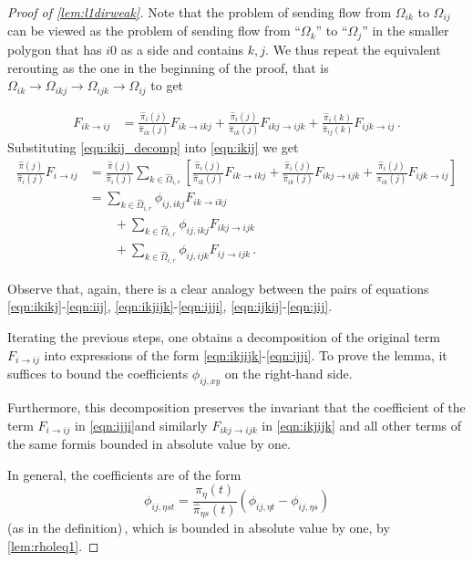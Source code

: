 \documentclass[a4paper, 12p]{article}
\numberwithin{equation}{section}
\newcommand{\Omorproj}{\hat{\Omega}}
\newcommand{\piorproj}{\hat{\pi}}
\newcommand{\flo}[2]{F_{#1 \rightarrow #2}}
\newcommand{\rar}{\rightarrow}
\newcommand{\Om}{\Omega}
\begin{document}
\begin{proof}[Proof of \cref{lem:l1dirweak}]
    Note that the problem of sending flow from $\Om_{ik}$ to $\Om_{ij}$ can be viewed as the problem of sending flow from ``$\Om_k$'' to ``$\Om_j$'' in the smaller polygon that has $i0$ as a side and contains $k,j$. We thus repeat the equivalent rerouting as the one in the beginning of the proof, that is $\Om_{ik}\rar\Om_{ikj}\rar\Om_{ijk}\rar\Om_{ij}$ to get
    
    \begin{align}\label{eqn:ikij_decomp}
        \flo{ik}{ij}&=\frac{\piorproj_i(j)}{\piorproj_{ik}(j)}\flo{ik}{ikj}+\frac{\piorproj_i(j)}{\piorproj_{ik}(j)}\flo{ikj}{ijk}+\frac{\piorproj_i(k)}{\piorproj_{ij}(k)}\flo{ijk}{ij}\,.
    \end{align}
    Substituting \eqref{eqn:ikij_decomp} into \eqref{eqn:ikij} we get
    \begin{align}
        \frac{\piorproj(j)}{\piorproj_i(j)}\flo{i}{ij}&=\frac{\piorproj(j)}{\piorproj_i(j)}\sum_{k\in\Omorproj_{i,r}} \left[ \frac{\piorproj_i(j)}{\piorproj_{ik}(j)}\flo{ik}{ikj}+\frac{\piorproj_i(j)}{\piorproj_{ik}(j)}\flo{ikj}{ijk}+\frac{\piorproj_i(j)}{\piorproj_{ik}(j)}\flo{ijk}{ij}\right] \nonumber\\
        &=\sum_{k\in\Omorproj_{i,r}}\phi_{ij,ikj}\flo{ik}{ikj} \label{eqn:ikikj}\\
        &\qquad + \sum_{k\in\Omorproj_{i,r}}\phi_{ij,ikj}\flo{ikj}{ijk} \label{eqn:ikjijk}\\
        &\qquad +\sum_{k\in\Omorproj_{i,r}}\phi_{ij,ijk}\flo{ij}{ijk} \,.\label{eqn:ijkij} 
    \end{align}

Observe that, again, there is a clear analogy between the pairs of equations \eqref{eqn:ikikj}-\eqref{eqn:iij}, \eqref{eqn:ikjijk}-\eqref{eqn:ijji}, \eqref{eqn:ijkij}-\eqref{eqn:jij}.

Iterating the previous steps, one obtains a decomposition of the original term $\flo{i}{ij}$ into expressions of the form \eqref{eqn:ikjijk}-\eqref{eqn:ijji}. To prove the lemma, it suffices to bound the coefficients $\phi_{ij,xy}$ on the right-hand side.

Furthermore, this decomposition preserves the invariant that the coefficient of the term $\flo{i}{ij}$ in \eqref{eqn:ijji}\textemdash and similarly $\flo{ikj}{ijk}$ in \eqref{eqn:ikjijk} and all other terms of the same form\textemdash is bounded in absolute value by one.

In general, the coefficients are of the form
\begin{equation}
    \label{eqn:rhoform}
    \phi_{ij,\eta st} = \frac{\piorproj_{\eta}(t)}{\piorproj_{\eta s}(t)}(\phi_{ij,\eta t} - \phi_{ij, \eta s})
\end{equation}
(as in the definition)\,,
which is bounded in absolute value by one, by \cref{lem:rholeq1}.


\end{proof}
\end{document}

